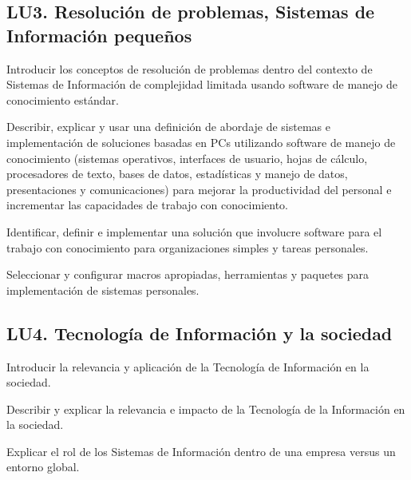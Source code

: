 \subsection{LU3. Resolución de problemas, Sistemas de Información pequeños}\label{sec:BOK-LU3}\label{sec:LU3}
\begin{LearningUnit}
\begin{LUGoal}
\item Introducir los conceptos de resolución de problemas dentro del contexto de Sistemas de Información de complejidad limitada usando software de manejo de conocimiento estándar.
\end{LUGoal}

\begin{LUObjective}
\item Describir, explicar y usar una definición de abordaje de sistemas e implementación de soluciones basadas en PCs utilizando software de manejo de conocimiento (sistemas operativos, interfaces de usuario, hojas de cálculo, procesadores de texto, bases de datos, estadísticas y manejo de datos, presentaciones y comunicaciones) para mejorar la productividad del personal e incrementar las capacidades de trabajo con conocimiento.
\item Identificar, definir e implementar una solución que involucre software para el trabajo con conocimiento para organizaciones simples y tareas personales.
\item Seleccionar y configurar macros apropiadas, herramientas y paquetes para implementación de sistemas personales.
\end{LUObjective}
\end{LearningUnit}

\subsection{LU4. Tecnología de Información y la sociedad}\label{sec:BOK-LU4}\label{sec:LU4}
\begin{LearningUnit}
\begin{LUGoal}
\item Introducir la relevancia y aplicación de la Tecnología de Información en la sociedad.
\end{LUGoal}

\begin{LUObjective}
\item Describir y explicar la relevancia e impacto de la Tecnología de la Información en la sociedad.
\item Explicar el rol de los Sistemas de Información dentro de una empresa versus un entorno global.
\end{LUObjective}
\end{LearningUnit}

